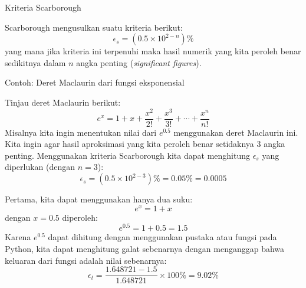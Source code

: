 \begin{frame}{Kriteria Scarborough}

Scarborough mengusulkan suatu kriteria berikut:
\begin{equation*}
\epsilon_{s} = (0.5 \times 10^{2-n})\%
\end{equation*}
yang mana jika kriteria ini terpenuhi maka hasil numerik yang kita peroleh
benar sedikitnya dalam $n$ angka penting (\textit{significant figures}).

\end{frame}



\begin{frame}[fragile]{Contoh: Deret Maclaurin dari fungsi eksponensial}
\fontsize{9}{10}\selectfont

Tinjau deret Maclaurin berikut:
\begin{equation*}
e^{x} = 1 + x + \frac{x^2}{2!} + \frac{x^3}{3!} + \cdots + \frac{x^{n}}{n!}
\end{equation*}
Misalnya kita ingin menentukan nilai dari $e^{0.5}$ menggunakan deret Maclaurin ini.
Kita ingin agar hasil aproksimasi yang kita peroleh benar setidaknya 3 angka penting.
Menggunakan kriteria Scarborough kita dapat menghitung $\epsilon_s$ yang
diperlukan (dengan $n=3$):
\begin{equation*}
\epsilon_{s} = (0.5 \times 10^{2-3})\% = 0.05\% = 0.0005
\end{equation*}

Pertama, kita dapat menggunakan hanya dua suku:
$$
e^{x} = 1 + x
$$
dengan $x = 0.5$ diperoleh:
$$
e^{0.5} = 1 + 0.5 = 1.5
$$
Karena $e^{0.5}$ dapat dihitung dengan menggunakan pustaka atau fungsi 
pada Python, kita dapat menghitung galat sebenarnya dengan menganggap bahwa keluaran
dari fungsi  adalah nilai sebenarnya:
$$
\epsilon_{t} = \frac{1.648721 - 1.5}{1.648721} \times 100\% = 9.02\%
$$
\end{frame}


